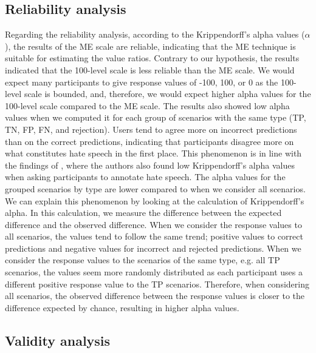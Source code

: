 \subsection{Reliability analysis}
\label{sec:discussion-reliability}
%
Regarding the reliability analysis, according to the Krippendorff's alpha values ($\alpha$), the results of the ME scale are reliable, indicating that the ME technique is suitable for estimating the value ratios.
%
Contrary to our hypothesis, the results indicated that the 100-level scale is less reliable than the ME scale.
%
We would expect many participants to give response values of -100, 100, or 0 as the 100-level scale is bounded, and, therefore, we would expect higher alpha values for the 100-level scale compared to the ME scale.
%
The results also showed low alpha values when we computed it for each group of scenarios with the same type (TP, TN, FP, FN, and rejection).
%
Users tend to agree more on incorrect predictions than on the correct predictions, indicating that participants disagree more on what constitutes hate speech in the first place.
%
This phenomenon is in line with the findings of \citet{ross2017measuring}, where the authors also found low Krippendorff's alpha values when asking participants to annotate hate speech.
%
The alpha values for the grouped scenarios by type are lower compared to when we consider all scenarios.
%
We can explain this phenomenon by looking at the calculation of Krippendorff's alpha.
%
In this calculation, we measure the difference between the expected difference and the observed difference.
%
When we consider the response values to all scenarios, the values tend to follow the same trend; positive values to correct predictions and negative values for incorrect and rejected predictions.
%
When we consider the response values to the scenarios of the same type, e.g. all TP scenarios, the values seem more randomly distributed as each participant uses a different positive response value to the TP scenarios.
%
Therefore, when considering all scenarios, the observed difference between the response values is closer to the difference expected by chance, resulting in higher alpha values.
%

%
\subsection{Validity analysis}
\label{sec:discussion-validity}

